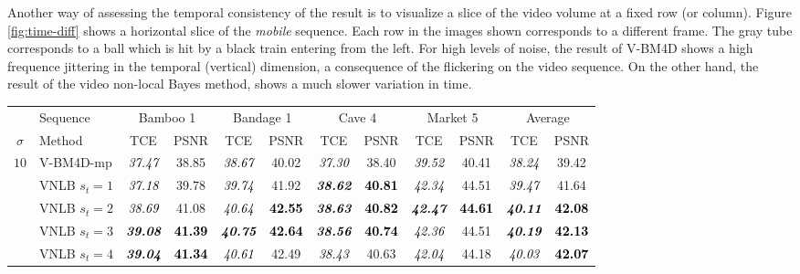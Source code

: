 \documentclass[10pt, journal, twocolumn, final, a4paper]{IEEEtran}
\newcommand{\best}[1]{#1}
\newcommand{\bsic}[1]{\textcolor{black}{\textit{#1}}}
\newcommand{\Bsic}[1]{\textcolor{black}{\textbf{\textit{#1}}}}
\newcommand{\Best}[1]{\textbf{\textcolor{black}{#1}}}
\begin{document}
Another way of assessing the temporal consistency of the result is to visualize a 
slice of the video volume at a fixed row (or column). Figure \ref{fig:time-diff} shows
a horizontal slice of the \emph{mobile} sequence. Each row in the images shown corresponds
to a different frame. The gray tube corresponds to a ball which is hit by a
black train entering from the left. For high levels of noise, the result of V-BM4D
shows a high frequence jittering in the temporal (vertical) dimension, a consequence
of the flickering on the video sequence. On the other hand, the result of the
video non-local Bayes method, shows a much slower variation in time.


\begin{table}[htp!]
	\begin{center}
		{\small
		\renewcommand{\tabcolsep}{1.6mm}
		\renewcommand{\arraystretch}{1.3}
		\begin{tabular}{ c | l |c c | c c | c c | c c | c c}
			\hline
			\rule{0pt}{10pt}         & Sequence          &\multicolumn{2}{c|}{Bamboo 1}&\multicolumn{2}{c|}{Bandage 1}&\multicolumn{2}{c|}{Cave 4} &\multicolumn{2}{c|}{Market 5}& \multicolumn{2}{c}{Average} \\
			\rule{0pt}{10pt}$\sigma$ & Method            & TCE          & PSNR         & TCE          & PSNR         & TCE          & PSNR         & TCE          & PSNR         & TCE          & PSNR         \\\hline
			\multirow{1}{*}{$10$}
			                      & V-BM4D-mp            & \bsic{37.47} &       38.85  & \bsic{38.67} &       40.02  & \bsic{37.30} &       38.40  & \bsic{39.52} &       40.41  & \bsic{38.24} &       39.42  \\
			                      & VNLB   $s_t = 1$     & \bsic{37.18} &       39.78  & \bsic{39.74} &       41.92  & \Bsic{38.62} & \Best{40.81} & \bsic{42.34} & \best{44.51} & \bsic{39.47} &       41.64  \\
			                      & VNLB   $s_t = 2$     & \bsic{38.69} &       41.08  & \bsic{40.64} & \Best{42.55} & \Bsic{38.63} & \Best{40.82} & \Bsic{42.47} & \Best{44.61} & \Bsic{40.11} & \Best{42.08} \\
			                      & VNLB   $s_t = 3$     & \Bsic{39.08} & \Best{41.39} & \Bsic{40.75} & \Best{42.64} & \Bsic{38.56} & \Best{40.74} & \bsic{42.36} &       44.51  & \Bsic{40.19} & \Best{42.13} \\
			                      & VNLB   $s_t = 4$     & \Bsic{39.04} & \Best{41.34} & \bsic{40.61} & \best{42.49} & \bsic{38.43} &       40.63  & \bsic{42.04} &       44.18  & \bsic{40.03} & \Best{42.07} \\\hline

\end{tabular}}
\end{center}
\end{table}
\end{document}
